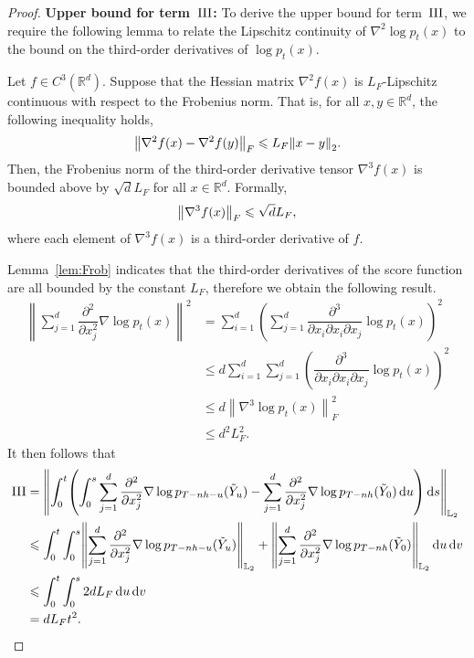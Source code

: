 \begin{proof}
\noindent \textbf{Upper bound for term~$\rm III$:}
To derive the upper bound for term~$\rm III$, we require the following lemma to relate the Lipschitz continuity of $\nabla^2\log p_t(x)$  to the bound on the third-order derivatives of $\log p_t(x)$.
\begin{lemma}
    Let $f\in C^3(\mathbb{R}^d)$. Suppose that the Hessian matrix $\nabla^2f(x)$ is $L_F$-Lipschitz continuous with respect to the Frobenius norm. That is, for all $x,y\in\mathbb{R}^d$, the following inequality holds,
    \begin{align*}
        \l|\nabla^2f(x)-\nabla^2f(y)\r|_F\leqslant L_F\l|x-y\r|_2.
    \end{align*}
    Then, the Frobenius norm of the third-order derivative tensor $\nabla^3f(x)$ is bounded above by $\sqrt{d}L_F$ for all $x\in\mathbb{R}^d$. Formally,
    \begin{align*}
        \l|\nabla^3f(x)\r|_F\leqslant \sqrt{d}L_F,
    \end{align*}
    where each element of $\nabla^3f(x)$ is a third-order derivative of $f$.
    \label{lem:Frob}
\end{lemma}
Lemma~\ref{lem:Frob} indicates that the third-order derivatives of the score function are all bounded by the constant $L_F$, therefore we obtain the following result.
\begin{align*}
    \left\lVert\sum_{j=1}^d\dfrac{\partial^2}{\partial x_j^2}\nabla\log p_t(x)\right\rVert^2
    &=\sum_{i=1}^d\left(\sum_{j=1}^d\dfrac{\partial^3}{\partial x_i\partial x_i\partial x_j}\log p_t(x)\right)^2\\
    &\leqslant d\sum_{i=1}^d\sum_{j=1}^d\left(\dfrac{\partial^3}{\partial x_i\partial x_i\partial x_j}\log p_t(x)\right)^2\\
    &\leqslant
    d\left\lVert\nabla^3\log p_t(x)\right\rVert_F^2\\
    &\leqslant d^2L_F^2.
\end{align*}
It then follows that
\begin{equation}
    \begin{aligned}
        \rm{III}&=\l|\int_0^t\left(\int_0^s\sum_{j=1}^d\dfrac{\partial^2}{\partial x_j^2}\nabla\log p_{T-nh-u}(\tilde{Y}_u)-\sum_{j=1}^d\dfrac{\partial^2}{\partial x_j^2}\nabla\log p_{T-nh}(\tilde{Y}_0)\rmd u\right)\rmd s\r|_{\Ltwo}\\
        &\leqslant\int_0^t\int_0^s\l|\sum_{j=1}^d\dfrac{\partial^2}{\partial x_j^2}\nabla\log p_{T-nh-u}(\tilde{Y}_u)\r|_{\Ltwo}+\l|\sum_{j=1}^d\dfrac{\partial^2}{\partial x_j^2}\nabla\log p_{T-nh}(\tilde{Y}_0)\r|_{\Ltwo}\rmd u\rmd v\\
        &\leqslant \int_0^t\int_0^s 2dL_F\rmd u\rmd v\\
        &=dL_Ft^2.
    \end{aligned}
    \label{eq:SOterm3}
\end{equation}


\end{proof}

